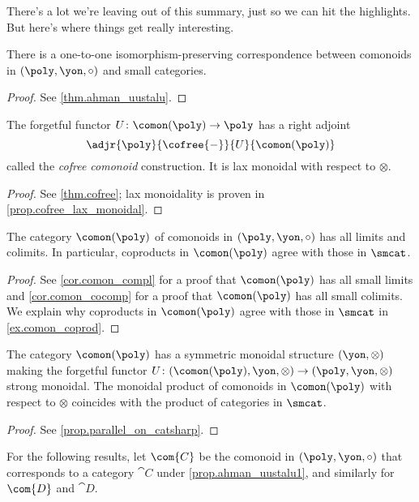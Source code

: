 There's a lot we're leaving out of this summary, just so we can hit the highlights.
But here's where things get really interesting.

\begin{proposition}\label{prop.ahman_uustalu1}
    There is a one-to-one isomorphism-preserving correspondence between comonoids in $(\poly,\yon,\circ)$ and small categories.
\end{proposition}
\begin{proof}
    See \cref{thm.ahman_uustalu}.
\end{proof}

\begin{proposition}
    The forgetful functor $U\colon\comon(\poly)\to\poly$ has a right adjoint
    \[
    \adjr{\poly}{\cofree{-}}{U}{\comon(\poly)}
    \]
    called the \emph{cofree comonoid} construction. It is lax monoidal with respect to $\otimes$.
\end{proposition}
\begin{proof}
    See \cref{thm.cofree}; lax monoidality is proven in \cref{prop.cofree_lax_monoidal}.
\end{proof}

\begin{proposition}
    The category $\comon(\poly)$ of comonoids in $(\poly,\yon,\circ)$ has all limits and colimits.
    In particular, coproducts in $\comon(\poly)$ agree with those in $\smcat$.
\end{proposition}
\begin{proof}
    See \cref{cor.comon_compl} for a proof that $\comon(\poly)$ has all small limits and \cref{cor.comon_cocomp} for a proof that $\comon(\poly)$ has all small colimits.
    We explain why coproducts in $\comon(\poly)$ agree with those in $\smcat$ in \cref{ex.comon_coprod}.
\end{proof}

\begin{proposition}
    The category $\comon(\poly)$ has a symmetric monoidal structure $(\yon,\otimes)$ making the forgetful functor $U\colon(\comon(\poly),\yon,\otimes)\to(\poly,\yon,\otimes)$ strong monoidal.
    The monoidal product of comonoids in $\comon(\poly)$ with respect to $\otimes$ coincides with the product of categories in $\smcat$.
\end{proposition}
\begin{proof}
    See \cref{prop.parallel_on_catsharp}.
\end{proof}

For the following results, let $\com{C}$ be the comonoid in $(\poly,\yon,\circ)$ that corresponds to a category $\cat{C}$ under \cref{prop.ahman_uustalu1}, and similarly for $\com{D}$ and $\cat{D}$.

